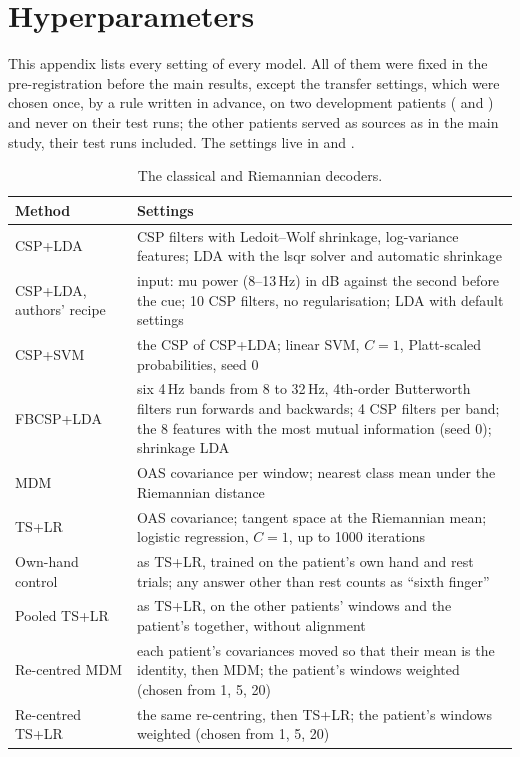 \chapter{Hyperparameters}\label{app:hyper}

This appendix lists every setting of every model. All of them were fixed in the
pre-registration before the main results, except the transfer settings, which were chosen once,
by a rule written in advance, on two development patients ( and ) and
never on their test runs; the other patients served as sources as in the main study, their
test runs included. The settings live in  and .

\begin{table}[!htbp]
\centering
\caption{The classical and Riemannian decoders.}
\label{tab:app-hyper-classical}
\footnotesize
\begin{tabularx}{\textwidth}{>{\raggedright\arraybackslash}p{3.0cm}>{\raggedright\arraybackslash}X}
\toprule
Method & Settings \\
\midrule
CSP+LDA & 6 CSP filters with Ledoit--Wolf shrinkage, log-variance features; LDA with the lsqr solver and automatic shrinkage \\
CSP+LDA, authors' recipe & input: mu power (8--13\,Hz) in dB against the second before the cue; 10 CSP filters, no regularisation; LDA with default settings \\
CSP+SVM & the CSP of CSP+LDA; linear SVM, $C = 1$, Platt-scaled probabilities, seed 0 \\
FBCSP+LDA & six 4\,Hz bands from 8 to 32\,Hz, 4th-order Butterworth filters run forwards and backwards; 4 CSP filters per band; the 8 features with the most mutual information (seed 0); shrinkage LDA \\
MDM & OAS covariance per window; nearest class mean under the Riemannian distance \\
TS+LR & OAS covariance; tangent space at the Riemannian mean; logistic regression, $C = 1$, up to 1000 iterations \\
Own-hand control & as TS+LR, trained on the patient's own hand and rest trials; any answer other than rest counts as ``sixth finger'' \\
Pooled TS+LR & as TS+LR, on the other patients' windows and the patient's together, without alignment \\
Re-centred MDM & each patient's covariances moved so that their mean is the identity, then MDM; the patient's windows weighted \rqTwoHparamRctMdmWeight{} (chosen from 1, 5, 20) \\
Re-centred TS+LR & the same re-centring, then TS+LR; the patient's windows weighted \rqTwoHparamRctTslrWeight{} (chosen from 1, 5, 20) \\
\bottomrule
\end{tabularx}
\end{table}

